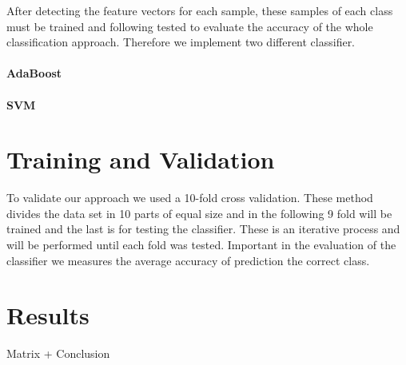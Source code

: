 \documentclass[a4paper,10pt]{article}
\begin{document}
After detecting the feature vectors for each sample, these samples of each class must be trained and following tested to evaluate the accuracy of the whole classification approach. 
Therefore we implement two different classifier. 
\paragraph{AdaBoost}

\paragraph{SVM}

\section{Training and Validation}
To validate our approach we used a 10-fold cross validation. 
These method divides the data set in 10 parts of equal size and in the following 9 fold will be trained and the last is for testing the classifier.
These is an iterative process and will be performed until each fold was tested.
Important in the evaluation of the classifier we measures the average accuracy of prediction the correct class.
\section{Results}
Matrix + Conclusion 
\end{document}
